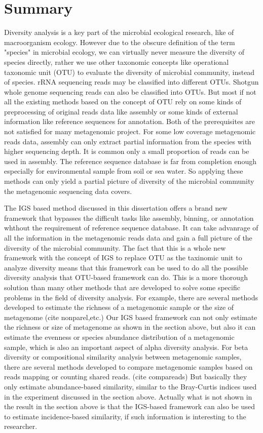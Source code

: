   

\section{Summary}

Diversity analysis is a key part of the microbial ecological research, like of
macroorganism ecology. However due to the obscure definition of the term
"species" in microbial ecology, we can virtually never measure the diversity of
species directly, rather we use other taxonomic concepts like operational
taxonomic unit (OTU) to evaluate the diversity of microbial community, instead
of species. rRNA sequencing reads may be classified into different OTUs.
Shotgun whole genome sequencing reads can also be classified into OTUs. But
most if not all
the existing methods based on the concept of OTU rely on some kinds of
preprocessing of original reads data like assembly or some kinds of external 
information like reference sequences for annotation. Both of the prerequisites
are not satisfied for many metagenomic project. For some low coverage
metagenomic reads data, assembly can only extract partial information from the
species with higher sequencing depth. It is common only a small proportion of
reads can be used in assembly. The reference sequence database is far from
completion enough especially for environmental sample from soil or sea water.
So applying these methods can only yield a partial picture of diversity of
the microbial community the metagenomic sequencing data covers. 

The IGS based
method discussed in this dissertation offers a brand new framework that
bypasses the difficult tasks like assembly, binning, or annotation whthout the
requirement of reference sequence database. It can take advanrage of all the 
information in the metagenomic reads data and gain a full picture of the
diversity of the microbial community. The fact that this is a whole new
framework with the concept of IGS to replace OTU as the taxinomic unit to
analyze diversity means that this framework can be used to do all the possible
diversity analysis that OTU-based framework can do. This is a more thorough
solution than many other methods that are developed to solve some specific
problems in the field of diversity analysis. For example, there are several
methods developed to estimate the richness of a metagenomic sample or the size 
of metagenome (cite nonparel,etc.) Our IGS based framework can not only
estimate the richness or size of metagenome as shown in the section above, but
also it can estimate the evenness or species abundance distribution of a
metagenomic sample, which is also an important aspect of alpha diversity
analysis. For beta diversity or compositional similarity analysis between
metagenomic samples, there are several methods developed to compare metagenomic
samples based on reads mapping or counting shared reads. (cite compareads)
But basically they only estimate abundance-based similarity, similar to
the Bray-Curtis indices used in the experiment discussed in the section above.
Actually what is not shown in the result in the section above is that the 
IGS-based framework can also be used to estimate incidence-based similarity, if
such information is interesting to the researcher.

